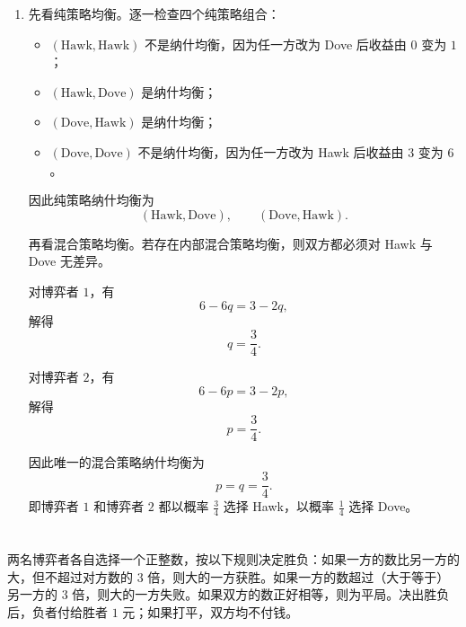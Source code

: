 \documentclass[12pt,a4paper]{article}
\begin{document}
\begin{enumerate}[label=\alph*.]
\begin{center}
  \end{center}

  文字解释如下：当对方选择 Hawk 的概率较低时，选择 Hawk 的收益更高；当对方选择 Hawk 的概率较高时，选择 Dove 更优；当对方选择 Hawk 的概率恰好等于 \(\frac34\) 时，两种策略的期望收益相等，因此任意混合都是最优反应。

  \item 先看纯策略均衡。逐一检查四个纯策略组合：
  \begin{itemize}
    \item \((\text{Hawk},\text{Hawk})\) 不是纳什均衡，因为任一方改为 Dove 后收益由 \(0\) 变为 \(1\)；
    \item \((\text{Hawk},\text{Dove})\) 是纳什均衡；
    \item \((\text{Dove},\text{Hawk})\) 是纳什均衡；
    \item \((\text{Dove},\text{Dove})\) 不是纳什均衡，因为任一方改为 Hawk 后收益由 \(3\) 变为 \(6\)。
  \end{itemize}
  因此纯策略纳什均衡为
  \[
    (\text{Hawk},\text{Dove}),\qquad (\text{Dove},\text{Hawk}).
  \]

  再看混合策略均衡。若存在内部混合策略均衡，则双方都必须对 Hawk 与 Dove 无差异。

  对博弈者 \(1\)，有
  \[
    6-6q=3-2q,
  \]
  解得
  \[
    q=\frac{3}{4}.
  \]

  对博弈者 \(2\)，有
  \[
    6-6p=3-2p,
  \]
  解得
  \[
    p=\frac{3}{4}.
  \]

  因此唯一的混合策略纳什均衡为
  \[
    p=q=\frac{3}{4}.
  \]
  即博弈者 \(1\) 和博弈者 \(2\) 都以概率 \(\frac34\) 选择 Hawk，以概率 \(\frac14\) 选择 Dove。
\end{enumerate}

\section{}
两名博弈者各自选择一个正整数，按以下规则决定胜负：如果一方的数比另一方的大，但不超过对方数的 \(3\) 倍，则大的一方获胜。如果一方的数超过（大于等于）另一方的 \(3\) 倍，则大的一方失败。如果双方的数正好相等，则为平局。决出胜负后，负者付给胜者 \(1\) 元；如果打平，双方均不付钱。
\end{document}
